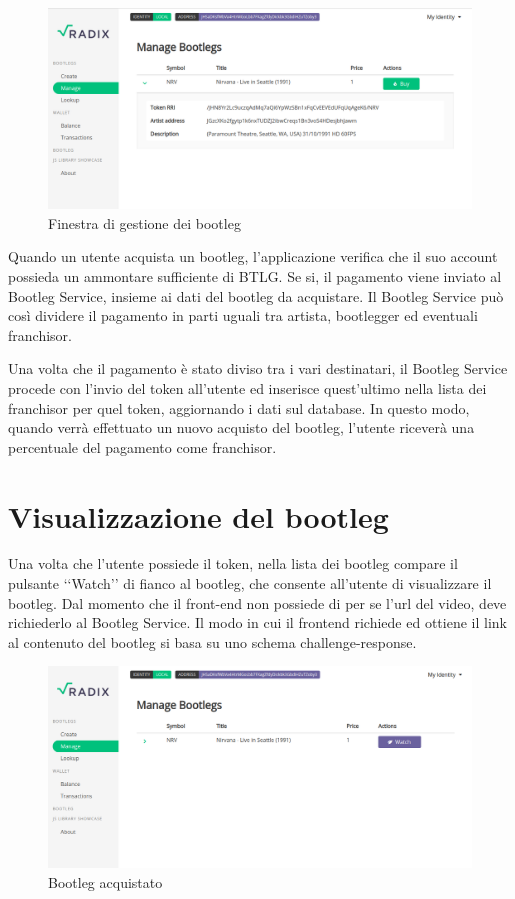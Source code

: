 \begin{figure}[H]
    \includegraphics[width=\linewidth]{images/application/manage-bootleg2.png}
    \caption{Finestra di gestione dei bootleg}
    \label{fig:manage_bootleg}
\end{figure}

Quando un utente acquista un bootleg, l'applicazione verifica che il suo account possieda un ammontare sufficiente di BTLG. Se si, il pagamento viene inviato al Bootleg Service, insieme ai dati del bootleg da acquistare. Il Bootleg Service può così dividere il pagamento in parti uguali tra artista, bootlegger ed eventuali franchisor.

Una volta che il pagamento è stato diviso tra i vari destinatari, il Bootleg Service procede con l'invio del token all'utente ed inserisce quest'ultimo nella lista dei franchisor per quel token, aggiornando i dati sul database. In questo modo, quando verrà effettuato un nuovo acquisto del bootleg, l'utente riceverà una percentuale del pagamento come franchisor. 

\section{Visualizzazione del bootleg}

Una volta che l'utente possiede il token, nella lista dei bootleg compare il pulsante ‘‘Watch’’ di fianco al bootleg, che consente all'utente di visualizzare il bootleg. Dal momento che il front-end non possiede di per se l'url del video, deve richiederlo al Bootleg Service. Il modo in cui il frontend richiede ed ottiene il link al contenuto del bootleg si basa su uno schema challenge-response. 

\begin{figure}[H]
    \includegraphics[width=\linewidth]{images/application/bootleg-purchased.png}
    \caption{Bootleg acquistato}
    \label{fig:bootleg_purchased}
\end{figure}

